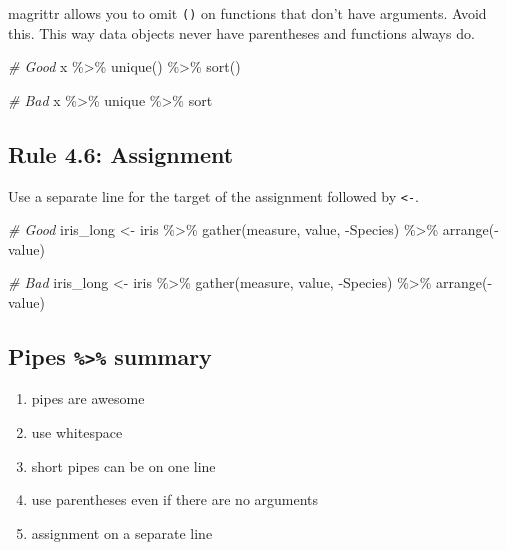\documentclass[
  letterpaper,
  DIV=11,
  numbers=noendperiod]{scrreprt}
\newenvironment{Shaded}{}{}
\newcommand{\CommentTok}[1]{\textcolor[rgb]{0.38,0.63,0.69}{\textit{#1}}}
\newcommand{\FunctionTok}[1]{\textcolor[rgb]{0.02,0.16,0.49}{#1}}
\newcommand{\NormalTok}[1]{#1}
\newcommand{\OtherTok}[1]{\textcolor[rgb]{0.00,0.44,0.13}{#1}}
\newcommand{\SpecialCharTok}[1]{\textcolor[rgb]{0.25,0.44,0.63}{#1}}
\providecommand{\tightlist}{%
  \setlength{\itemsep}{0pt}\setlength{\parskip}{0pt}}\usepackage{longtable,booktabs,array}
\begin{document}
magrittr allows you to omit \texttt{()} on functions that don't have
arguments. Avoid this. This way data objects never have parentheses and
functions always do.

\begin{Shaded}
\begin{Highlighting}[]
\CommentTok{\# Good}
\NormalTok{x }\SpecialCharTok{\%\textgreater{}\%}
  \FunctionTok{unique}\NormalTok{() }\SpecialCharTok{\%\textgreater{}\%}
  \FunctionTok{sort}\NormalTok{()}

\CommentTok{\# Bad}
\NormalTok{x }\SpecialCharTok{\%\textgreater{}\%}
\NormalTok{  unique }\SpecialCharTok{\%\textgreater{}\%}
\NormalTok{  sort}
\end{Highlighting}
\end{Shaded}

\subsection{Rule 4.6: Assignment}\label{rule-4.6-assignment}

Use a separate line for the target of the assignment followed by
\texttt{\textless{}-}.

\begin{Shaded}
\begin{Highlighting}[]
\CommentTok{\# Good}
\NormalTok{iris\_long }\OtherTok{\textless{}{-}}
\NormalTok{  iris }\SpecialCharTok{\%\textgreater{}\%}
  \FunctionTok{gather}\NormalTok{(measure, value, }\SpecialCharTok{{-}}\NormalTok{Species) }\SpecialCharTok{\%\textgreater{}\%}
  \FunctionTok{arrange}\NormalTok{(}\SpecialCharTok{{-}}\NormalTok{value)}

\CommentTok{\# Bad}
\NormalTok{iris\_long }\OtherTok{\textless{}{-}}\NormalTok{ iris }\SpecialCharTok{\%\textgreater{}\%}
  \FunctionTok{gather}\NormalTok{(measure, value, }\SpecialCharTok{{-}}\NormalTok{Species) }\SpecialCharTok{\%\textgreater{}\%}
  \FunctionTok{arrange}\NormalTok{(}\SpecialCharTok{{-}}\NormalTok{value)}
\end{Highlighting}
\end{Shaded}

\subsection{\texorpdfstring{Pipes \texttt{\%\textgreater{}\%}
summary}{Pipes \%\textgreater\% summary}}\label{pipes-summary}

\begin{enumerate}
\def\labelenumi{\arabic{enumi}.}
\tightlist
\item
  pipes are awesome
\item
  use whitespace
\item
  short pipes can be on one line
\item
  use parentheses even if there are no arguments
\item
  assignment on a separate line
\end{enumerate}
\end{document}
